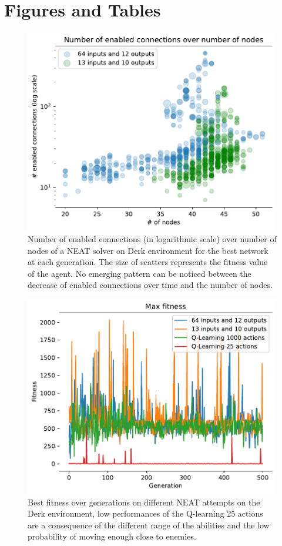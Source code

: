 \clearpage
\newpage
\onecolumn
\appendices
\section{Figures and Tables}

\begin{figure}[H]
    \centering
    \includegraphics[width=0.6\linewidth]{./images/n_enabled_connections_over_n_nodes_derk_neat.pdf}
    \caption{Number of enabled connections (in logarithmic scale) over number of nodes of a NEAT solver on Derk environment for the best network at each generation. The size of scatters represents the fitness value of the agent. No emerging pattern can be noticed between the decrease of enabled connections over time and the number of nodes.}
    \label{fig:enabled-connection-nodes-derk-neat}
\end{figure}

\begin{figure}[H]
    \centering
    \includegraphics[width=0.6\linewidth]{./images/fitness_over_iterations_derk_neat.pdf}
    \caption{Best fitness over generations on different NEAT attempts on the Derk environment, low performances of the Q-learning 25 actions are a consequence of the different range of the abilities and the low probability of moving enough close to enemies.}
    \label{fig:fitness-neat-derk}
\end{figure}



